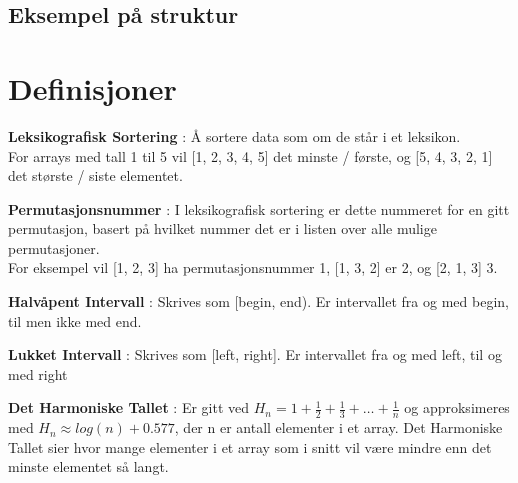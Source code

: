 \documentclass[11pt]{article}
\begin{document}
\subsection{Eksempel på struktur}


\newpage

\section{Definisjoner}

\textbf{Leksikografisk Sortering} : Å sortere data som om de står i et leksikon.\\
For arrays med tall 1 til 5 vil [1, 2, 3, 4, 5] det minste / første, og [5, 4, 3, 2, 1] det største / siste elementet.

\textbf{Permutasjonsnummer} : I leksikografisk sortering er dette nummeret for en gitt permutasjon, basert på hvilket nummer det er i listen over alle mulige permutasjoner.\\
For eksempel vil [1, 2, 3] ha permutasjonsnummer 1, [1, 3, 2] er 2, og [2, 1, 3] 3.

\textbf{Halvåpent Intervall} : Skrives som [begin, end). Er intervallet fra og med begin, til men ikke med end.

\textbf{Lukket Intervall} : Skrives som [left, right]. Er intervallet fra og med left, til og med right

\textbf{Det Harmoniske Tallet} : Er gitt ved $H_n = 1 + \frac{1}{2} + \frac{1}{3} + \dots + \frac{1}{n}$ og approksimeres med $H_n\approx log(n) + 0.577$, der n er antall elementer i et array.
Det Harmoniske Tallet sier hvor mange elementer i et array som i snitt vil være mindre enn det minste elementet så langt.

\printindex
\end{document}
